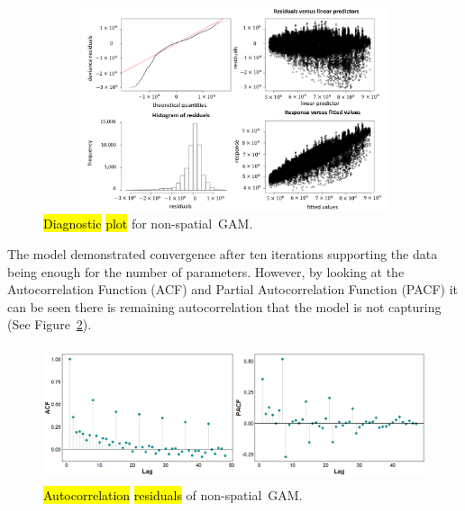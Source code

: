 \documentclass[energies,article,accept,pdftex,moreauthors]{Definitions/mdpi}
\begin{document}
    
    \begin{figure}[H]
		\includegraphics[height=6cm, width=14cm]{figs/diagnosticplot.png}
	\caption{\hl{Diagnostic} %
 \hl{plot} %
 for non-spatial~GAM. \label{fig:4}}
    \end{figure}
    
    The model demonstrated convergence after ten iterations supporting the data being enough for the number of parameters. However, by looking at the Autocorrelation Function (ACF) and Partial Autocorrelation Function (PACF) it can be seen there is remaining autocorrelation that the model is not capturing (See Figure~\ref{fig:5}).

    \begin{figure}[H]
		\includegraphics[height=4cm, width=14cm]{figs/Autocorrelation_Residuals.png}
	\caption{\hl{Autocorrelation} %
	\hl{residuals} %
 of non-spatial~GAM. \label{fig:5}}
    \end{figure}
        
\end{document}
